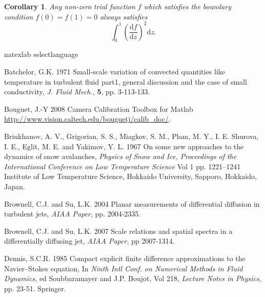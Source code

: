 \documentclass[lineno]{jfm}
\newtheorem{corollary}{Corollary}
\begin{document}
{{\begin{corollary}
Any non-zero trial function $f$ which satisfies the boundary condition
$f(0)=f(1)=0$ always satisfies
\begin{equation}
  \int_0^1 \left( \frac{\mathrm{d} f}{\mathrm{d} z} \right)^2 \mathrm{d} z.
\end{equation}
\end{corollary}


%
%


%

\begin{thebibliography}{99}

\expandafter\ifx\csname natexlab\endcsname\relax
\def\natexlab#1{#1}\fi
\expandafter\ifx\csname selectlanguage\endcsname\relax
\def\selectlanguage#1{\relax}\fi

{\sc Batchelor, G.K.} 1971 {Small-scale variation of convected quantities like temperature in turbulent fluid part1, general discussion and the case of small conductivity}, {\it J. Fluid Mech.}, {\bf 5}, pp. 3-113-133.

{\sc Bouguet, J.-Y} 2008 Camera Calibration Toolbox for Matlab {\url{http://www.vision.caltech.edu/bouguetj/calib_doc/}}.

{\sc Briukhanov, A. V.,   Grigorian, S. S., Miagkov,  S. M., Plam, M. Y.,   I. E. Shurova, I. E.,   Eglit, M. E. and Yakimov, Y. L.} 1967
{On some new approaches to the dynamics of snow avalanches},
{\it Physics of Snow and Ice,  Proceedings of the International Conference on Low Temperature Science}
{Vol 1} pp. 1221--1241 {Institute of Low Temperature Science, Hokkaido University, Sapporo, Hokkaido, Japan}.

 {\sc Brownell,  C.J.  and Su,  L.K.} 2004  {Planar measurements of differential diffusion in turbulent jets}, {\it AIAA Paper},  pp. 2004-2335.

  {\sc Brownell, C.J. and  Su, L.K.} 2007 {Scale relations and spatial spectra in a differentially diffusing jet}, {\it AIAA Paper}, pp 2007-1314.

 {\sc  Dennis, S.C.R.} 1985 {Compact explicit finite difference approximations to the Navier--Stokes equation},  { In \it Ninth Intl Conf. on Numerical Methods in Fluid Dynamics},  {ed Soubbaramayer and J.P. Boujot},  {Vol 218}, {\it Lecture Notes in Physics}, pp. 23-51. Springer.


\end{thebibliography}}}
\end{document}
